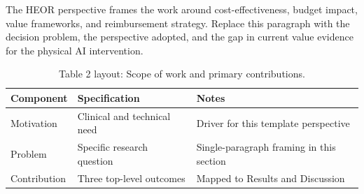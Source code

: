 
The HEOR perspective frames the work around cost-effectiveness, budget impact, value frameworks, and reimbursement strategy. Replace this paragraph with the decision problem, the perspective adopted, and the gap in current value evidence for the physical AI intervention.

\begin{table}[H]
\caption{Table 2 layout: Scope of work and primary contributions.}
\label{tab:intro_overview}
\centering
\begin{tabular}{>{\raggedright\arraybackslash}p{3.4cm} >{\raggedright\arraybackslash}p{4.6cm} >{\raggedright\arraybackslash}p{5.4cm}}
\toprule
\textbf{Component} & \textbf{Specification} & \textbf{Notes} \\
\midrule
  Motivation & Clinical and technical need & Driver for this template perspective \\
  Problem & Specific research question & Single-paragraph framing in this section \\
  Contribution & Three top-level outcomes & Mapped to Results and Discussion \\
\bottomrule
\end{tabular}
\end{table}
